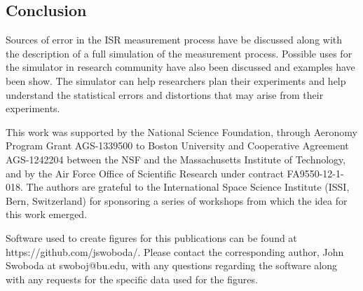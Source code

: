 \documentclass[draft,ras]{agutex}
\begin{document}
\begin{article}
\section{Conclusion}
Sources of error in the ISR measurement process have be discussed along with the description of a full simulation of the measurement process. Possible uses for the simulator in research community have also been discussed and examples have been show. The simulator can help researchers plan their experiments and help understand the statistical errors and distortions that may arise from their experiments. 

\begin{acknowledgments}
This work was supported by the National Science Foundation, through Aeronomy Program Grant AGS-1339500 to Boston University and Cooperative Agreement AGS-1242204 between the NSF and the Massachusetts Institute of Technology, and by the Air Force Office of Scientific Research under contract FA9550-12-1-018.   The authors are grateful to the International Space Science Institute (ISSI, Bern, Switzerland) for sponsoring a series of workshops from which the idea for this work emerged. 

Software used to create figures for this publications can be found at https://github.com/jswoboda/. Please contact the corresponding author, John Swoboda at swoboj@bu.edu, with any questions regarding the software along with any requests for the specific data used for the figures. \end{acknowledgments}




\end{article}
\end{document}
